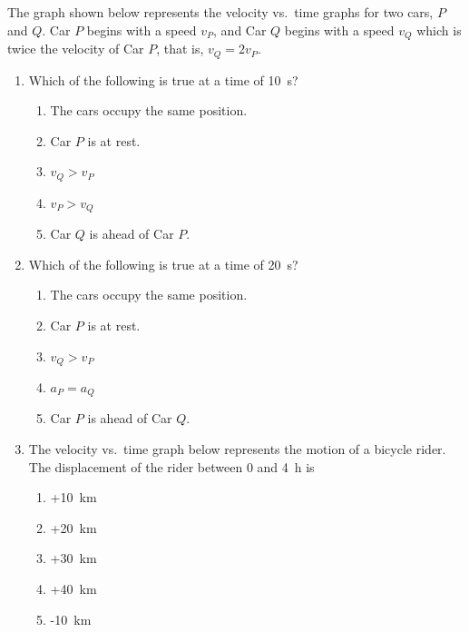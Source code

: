 \documentclass{../../oss-apphys}
\begin{document}
\begin{multicols}{2}
  The graph shown below represents the velocity vs.\ time graphs for two cars,
  $P$ and $Q$. Car $P$ begins with a speed $v_P$, and Car $Q$ begins with a
  speed $v_Q$ which is twice the velocity of Car $P$, that is, $v_Q=2v_P$.
  \begin{center}
  \end{center}
  \begin{enumerate}[resume,leftmargin=18pt]
  \item Which of the following is true at a time of \SI{10}{\second}?
    \begin{enumerate}[noitemsep,topsep=0pt,leftmargin=18pt,label=(\Alph*)]
    \item The cars occupy the same position.
    \item Car $P$ is at rest.
    \item $v_Q>v_P$
    \item $v_P>v_Q$
    \item Car $Q$ is ahead of Car $P$.
    \end{enumerate}

  \item Which of the following is true at a time of \SI{20}{\second}?
    \begin{enumerate}[noitemsep,topsep=0pt,leftmargin=18pt,label=(\Alph*)]
    \item The cars occupy the same position.
    \item Car $P$ is at rest.
    \item $v_Q>v_P$
    \item $a_P=a_Q$
    \item Car $P$ is ahead of Car $Q$.
    \end{enumerate}

  \item The velocity vs.\ time graph below represents the motion of a bicycle
    rider. The displacement of the rider between $0$ and \SI{4}{\hour} is
    \begin{center}
    \end{center}
    \begin{enumerate}[noitemsep,topsep=0pt,leftmargin=18pt,label=(\Alph*)]
    \item +\SI{10}{\kilo\metre}
    \item +\SI{20}{\kilo\metre}
    \item +\SI{30}{\kilo\metre}
    \item +\SI{40}{\kilo\metre}
    \item -\SI{10}{\kilo\metre}
    \end{enumerate}
    \columnbreak
    

\end{enumerate}
\end{multicols}
\end{document}
